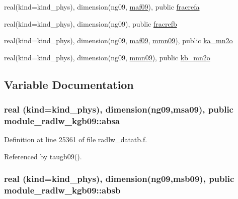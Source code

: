 \begin{DoxyCompactItemize}
\item 
real(kind=kind\+\_\+phys), dimension(ng09, \hyperlink{namespacemodule__radlw__kgb09_a7d5d565c87af7ef07dc17930f9cb9e57}{maf09}), public \hyperlink{namespacemodule__radlw__kgb09_ace3d3e2731609f7ea50eb798bd212f3b}{fracrefa}
\item 
real(kind=kind\+\_\+phys), dimension(ng09), public \hyperlink{namespacemodule__radlw__kgb09_a26476f00fe13c1c81d3ae0cf8e43c90b}{fracrefb}
\item 
real(kind=kind\+\_\+phys), dimension(ng09, \hyperlink{namespacemodule__radlw__kgb09_a7d5d565c87af7ef07dc17930f9cb9e57}{maf09}, \hyperlink{namespacemodule__radlw__kgb09_aa9c8294b56ac3ce90b07114e986777a9}{mmn09}), public \hyperlink{namespacemodule__radlw__kgb09_a37d98e8066c5995060a2a8451b45705f}{ka\+\_\+mn2o}
\item 
real(kind=kind\+\_\+phys), dimension(ng09, \hyperlink{namespacemodule__radlw__kgb09_aa9c8294b56ac3ce90b07114e986777a9}{mmn09}), public \hyperlink{namespacemodule__radlw__kgb09_a79326139db789012d47c4750917c2cdb}{kb\+\_\+mn2o}
\end{DoxyCompactItemize}


\subsection{Variable Documentation}
\subsubsection[{\texorpdfstring{absa}{absa}}]{\setlength{\rightskip}{0pt plus 5cm}real (kind=kind\+\_\+phys), dimension(ng09,{\bf msa09}), public module\+\_\+radlw\+\_\+kgb09\+::absa}\hypertarget{namespacemodule__radlw__kgb09_a7a8726efe46fac4d6cce55ca357199ab}{}\label{namespacemodule__radlw__kgb09_a7a8726efe46fac4d6cce55ca357199ab}


Definition at line 25361 of file radlw\+\_\+datatb.\+f.



Referenced by taugb09().

\subsubsection[{\texorpdfstring{absb}{absb}}]{\setlength{\rightskip}{0pt plus 5cm}real (kind=kind\+\_\+phys), dimension(ng09,{\bf msb09}), public module\+\_\+radlw\+\_\+kgb09\+::absb}\hypertarget{namespacemodule__radlw__kgb09_adb2110a245d9f01b3fd1ab058c883003}{}\label{namespacemodule__radlw__kgb09_adb2110a245d9f01b3fd1ab058c883003}


